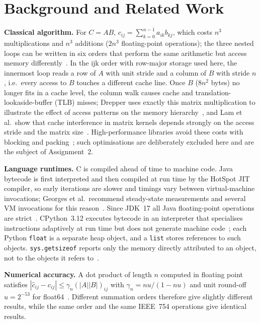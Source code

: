 \documentclass[conference,a4paper]{IEEEtran}
\begin{document}
\section{Background and Related Work}
\label{sec:background}
\textbf{Classical algorithm.} For $C=AB$, $c_{ij}=\sum_{k=0}^{n-1} a_{ik}b_{kj}$, which costs $n^3$ multiplications
and $n^3$ additions ($2n^3$ floating-point operations); the three nested loops can be written in six orders that
perform the same arithmetic but access memory differently~\cite{golub2013}. In the ijk order with row-major storage
used here, the innermost loop reads a row of $A$ with unit stride and a column of $B$ with stride $n$, i.e.\ every
access to $B$ touches a different cache line. Once $B$ ($8n^2$ bytes) no longer fits in a cache level, the
column walk causes cache and translation-lookaside-buffer (TLB) misses; Drepper uses exactly this matrix
multiplication to illustrate the effect of access patterns on the memory hierarchy~\cite{drepper2007}, and Lam
et al.\ show that cache interference in matrix kernels depends strongly on the access stride and the matrix
size~\cite{lam1991}. High-performance libraries avoid these costs with blocking and packing~\cite{goto2008}; such
optimisations are deliberately excluded here and are the subject of Assignment~2.

\textbf{Language runtimes.} C is compiled ahead of time to machine code. Java bytecode is first interpreted and then
compiled at run time by the HotSpot JIT compiler, so early iterations are slower and timings vary between
virtual-machine invocations; Georges et al.\ recommend steady-state measurements and several VM invocations for
this reason~\cite{georges2007}. Since JDK~17 all Java floating-point operations are strict~\cite{jep306}.
CPython~3.12 executes bytecode in an interpreter that specialises instructions adaptively at run time but does not
generate machine code~\cite{pep659}; each Python \texttt{float} is a separate heap object, and a \texttt{list} stores
references to such objects. \texttt{sys.getsizeof} reports only the memory directly attributed to an object, not to
the objects it refers to~\cite{pydocsys}.

\textbf{Numerical accuracy.} A dot product of length $n$ computed in floating point satisfies
$|\hat{c}_{ij}-c_{ij}|\le\gamma_n(|A||B|)_{ij}$ with $\gamma_n=nu/(1-nu)$ and unit round-off $u=2^{-53}$ for
float64~\cite{higham2002}. Different summation orders therefore give slightly different results, while the same
order and the same IEEE~754 operations give identical results.
\end{document}
